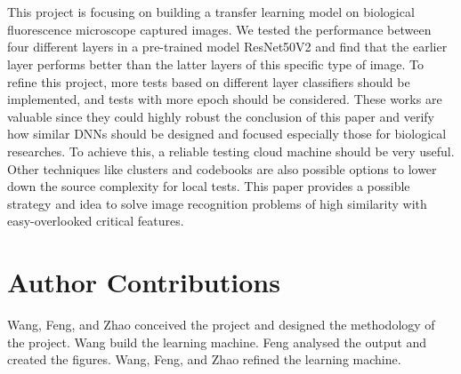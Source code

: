 \documentclass{article}
\begin{document}
\\
\\
This project is focusing on building a transfer learning model on biological fluorescence microscope captured images. We tested the performance between four different layers in a pre-trained model ResNet50V2 and find that the earlier layer performs better than the latter layers of this specific type of image. To refine this project, more tests based on different layer classifiers should be implemented, and tests with more epoch should be considered. These works are valuable since they could highly robust the conclusion of this paper and verify how similar DNNs should be designed and focused especially those for biological researches. To achieve this, a reliable testing cloud machine should be very useful. Other techniques like clusters and codebooks are also possible options to lower down the source complexity for local tests. This paper provides a possible strategy and idea to solve image recognition problems of high similarity with easy-overlooked critical features.

\section{Author Contributions}
Wang, Feng, and Zhao conceived the project and designed the methodology of the project. Wang build the learning machine. Feng analysed the output and created the figures. Wang, Feng, and Zhao refined the learning machine. 

\newpage


\end{document}
